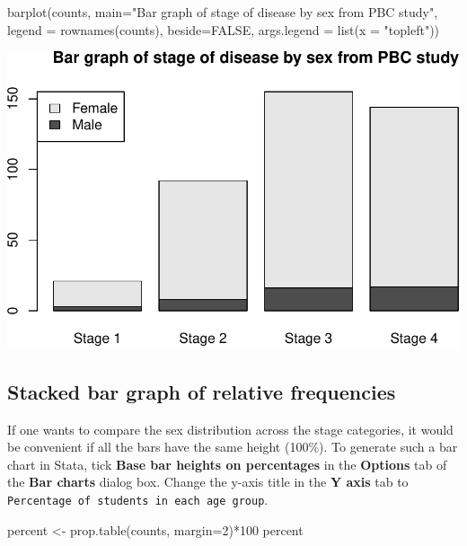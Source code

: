 \documentclass[
]{memoir}
\newenvironment{Shaded}{\begin{snugshade}}{\end{snugshade}}
\newcommand{\AttributeTok}[1]{\textcolor[rgb]{0.77,0.63,0.00}{#1}}
\newcommand{\ConstantTok}[1]{\textcolor[rgb]{0.00,0.00,0.00}{#1}}
\newcommand{\DecValTok}[1]{\textcolor[rgb]{0.00,0.00,0.81}{#1}}
\newcommand{\FunctionTok}[1]{\textcolor[rgb]{0.00,0.00,0.00}{#1}}
\newcommand{\NormalTok}[1]{#1}
\newcommand{\OtherTok}[1]{\textcolor[rgb]{0.56,0.35,0.01}{#1}}
\newcommand{\SpecialCharTok}[1]{\textcolor[rgb]{0.00,0.00,0.00}{#1}}
\newcommand{\StringTok}[1]{\textcolor[rgb]{0.31,0.60,0.02}{#1}}
\begin{document}
\begin{Shaded}
\begin{Highlighting}[]
\FunctionTok{barplot}\NormalTok{(counts, }\AttributeTok{main=}\StringTok{"Bar graph of stage of disease by sex from PBC study"}\NormalTok{,}
        \AttributeTok{legend =} \FunctionTok{rownames}\NormalTok{(counts), }\AttributeTok{beside=}\ConstantTok{FALSE}\NormalTok{, }\AttributeTok{args.legend =} \FunctionTok{list}\NormalTok{(}\AttributeTok{x =} \StringTok{"topleft"}\NormalTok{))}
\end{Highlighting}
\end{Shaded}

\includegraphics{phcm9795-R-notes_files/figure-latex/unnamed-chunk-36-1.pdf}

\hypertarget{stacked-bar-graph-of-relative-frequencies}{%
\subsection{Stacked bar graph of relative frequencies}\label{stacked-bar-graph-of-relative-frequencies}}

If one wants to compare the sex distribution across the stage categories, it would be convenient if all the bars have the same height (100\%). To generate such a bar chart in Stata, tick \textbf{Base bar heights on percentages} in the \textbf{Options} tab of the \textbf{Bar charts} dialog box. Change the y-axis title in the \textbf{Y axis} tab to \texttt{Percentage\ of\ students\ in\ each\ age\ group}.

\begin{Shaded}
\begin{Highlighting}[]
\NormalTok{percent }\OtherTok{\textless{}{-}} \FunctionTok{prop.table}\NormalTok{(counts, }\AttributeTok{margin=}\DecValTok{2}\NormalTok{)}\SpecialCharTok{*}\DecValTok{100}
\NormalTok{percent}
\end{Highlighting}
\end{Shaded}
\end{document}

